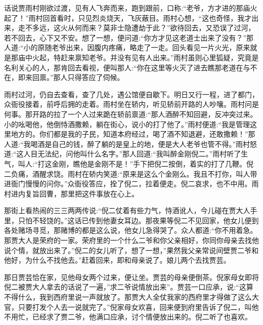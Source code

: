 


\begin{parag}
    话说贾雨村刚欲过渡，见有人飞奔而来，跑到跟前，口称:“老爷，方才进的那庙火起了！”雨村回首看时，只见烈炎烧天，飞灰蔽目。雨村心想，“这也奇怪，我才出来，走不多远，这火从何而来？莫非士隐遭劫于此？”欲待回去，又恐误了过河，若不回去，心下又不安。想了一想，便问道:“你方才见这老道士出来了没有？”那人道:“小的原随老爷出来，因腹内疼痛，略走了一走。回头看见一片火光，原来就是那庙中火起，特赶来禀知老爷。并没有见有人出来。”雨村虽则心里狐疑，究竟是名利关心的人，那肯回去看视，便叫那人:“你在这里等火灭了进去瞧那老道在与不在，即来回禀。”那人只得答应了伺候。
\end{parag}


\begin{parag}
    雨村过河，仍自去查看，查了几处，遇公馆便自歇下。明日又行一程，进了都门，众衙役接着，前呼后拥的走着。雨村坐在轿内，听见轿前开路的人吵嚷。雨村问是何事。那开路的拉了一个人过来跪在轿前禀道:“那人酒醉不知回避，反冲突过来。小的吆喝他，他倒恃酒撒赖，躺在街心，说小的打了他了。”雨村便道:“我是管理这里地方的。你们都是我的子民，知道本府经过，喝了酒不知退避，还敢撒赖！”那人道:“我喝酒是自己的钱，醉了躺的是皇上的地，便是大人老爷也管不得。”雨村怒道:“这人目无法纪，问他叫什么名字。”那人回道:“我叫醉金刚倪二。”雨村听了生气，叫人:“打这金刚，瞧他是金刚不是！”手下把倪二按倒，着实的打了几鞭。倪二负痛，酒醒求饶。雨村在轿内笑道:“原来是这么个金刚么。我且不打你，叫人带进衙门慢慢的问你。”众衙役答应，拴了倪二，拉着便走。倪二哀求，也不中用。雨村进内复旨回曹，那里把这件事放在心上。
\end{parag}


\begin{parag}
    那街上看热闹的三三两两传说:“倪二仗着有些力气，恃酒讹人，今儿碰在贾大人手里，只怕不轻饶的。”这话已传到他妻女耳边。那夜果等倪二不见回家，他女儿便到各处赌场寻觅，那赌博的都是这么说，他女儿急得哭了。众人都道:“你不用着急。那贾大人是荣府的一家。荣府里的一个什么二爷和你父亲相好，你同你母亲去找他说个情，就放出来了。”倪二的女儿听了，想了一想，”果然我父亲常说间壁贾二爷和他好，为什么不找他去。”赶着回来，即和母亲说了。娘儿两个去找贾芸。
\end{parag}


\begin{parag}
    那日贾芸恰在家，见他母女两个过来，便让坐。贾芸的母亲便倒茶。倪家母女即将倪二被贾大人拿去的话说了一遍，”求二爷说情放出来”。贾芸一口应承，说:“这算不得什么，我到西府里说一声就放了。那贾大人全仗我家的西府里才得做了这么大官，只要打发个人去一说就完了。”倪家母女欢喜，回来便到府里告诉了倪二，叫他不用忙，已经求了贾二爷，他满口应承，讨个情便放出来的。倪二听了也喜欢。
\end{parag}


